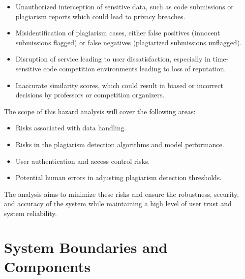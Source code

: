 \documentclass{article}
\begin{document}
\begin{itemize}
    \item Unauthorized interception of sensitive data, such as code submissions or plagiarism reports which could lead to privacy breaches.
    \item Misidentification of plagiarism cases, either false positives (innocent submissions flagged) or false negatives (plagiarized submissions unflagged).
    \item Disruption of service leading to user dissatisfaction, especially in time-sensitive code competition environments leading to loss of reputation.
    \item Inaccurate similarity scores, which could result in biased or incorrect decisions by professors or competition organizers.
\end{itemize}

The scope of this hazard analysis will cover the following areas:
\begin{itemize}
    \item Risks associated with data handling.
    \item Risks in the plagiarism detection algorithms and model performance.
    \item User authentication and access control risks.
    \item Potential human errors in adjusting plagiarism detection thresholds.
\end{itemize}

The analysis aims to minimize these risks and ensure the robustness, security, and accuracy of the system while maintaining a high level of user trust and system reliability.


\section{System Boundaries and Components}

\end{document}

